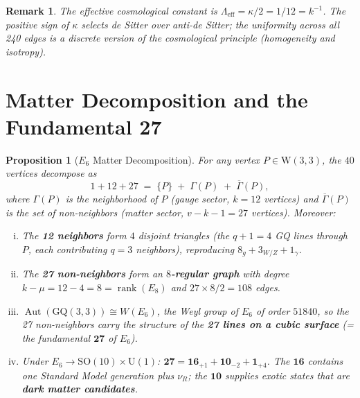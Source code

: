 \documentclass[12pt,a4paper]{article}
\newtheorem{proposition}[theorem]{Proposition}
\newtheorem{remark}[theorem]{Remark}
\newcommand{\W}{\mathrm{W}(3,3)}
\begin{document}
\begin{remark}
The effective cosmological constant is
$\Lambda_{\mathrm{eff}} = \kappa/2 = 1/12 = k^{-1}$.
The \emph{positive sign} of $\kappa$ selects de Sitter over
anti-de Sitter; the \emph{uniformity} across all 240 edges
is a discrete version of the cosmological principle (homogeneity
and isotropy).
\end{remark}

\section{Matter Decomposition and the Fundamental 27}
\label{sec:matter}

\begin{proposition}[$E_6$ Matter Decomposition]\label{prop:matter}
For any vertex $P \in \W$, the $40$ vertices decompose as
\[
  \boxed{1 + 12 + 27}
  \;=\; \{P\} \;+\; \Gamma(P) \;+\; \overline{\Gamma}(P),
\]
where $\Gamma(P)$ is the neighborhood of $P$ (gauge sector,
$k = 12$ vertices) and $\overline{\Gamma}(P)$ is the set of
non-neighbors (matter sector, $v - k - 1 = 27$ vertices). Moreover:
\begin{enumerate}[(i)]
  \item The \textbf{12 neighbors} form $4$ disjoint triangles
        (the $q{+}1 = 4$ GQ lines through $P$, each contributing
        $q = 3$ neighbors), reproducing $8_g + 3_{W/Z} + 1_\gamma$.
  \item The \textbf{27 non-neighbors} form an \textbf{$8$-regular graph}
        with degree $k - \mu = 12 - 4 = 8 = \operatorname{rank}(E_8)$
        and $27 \times 8 / 2 = 108$ edges.
  \item $\operatorname{Aut}(\mathrm{GQ}(3,3)) \cong W(E_6)$, the
        Weyl group of $E_6$ of order $51840$, so the 27 non-neighbors
        carry the structure of the \textbf{27 lines on a cubic surface}
        (= the fundamental $\mathbf{27}$ of $E_6$).
  \item Under $E_6 \to \mathrm{SO}(10) \times \mathrm{U}(1)$:
        $\mathbf{27} = \mathbf{16}_{+1} + \mathbf{10}_{-2} + \mathbf{1}_{+4}$.
        The $\mathbf{16}$ contains one Standard Model generation plus
        $\nu_R$; the $\mathbf{10}$ supplies exotic states that are
        \textbf{dark matter candidates}.
\end{enumerate}
\end{proposition}
\end{document}
